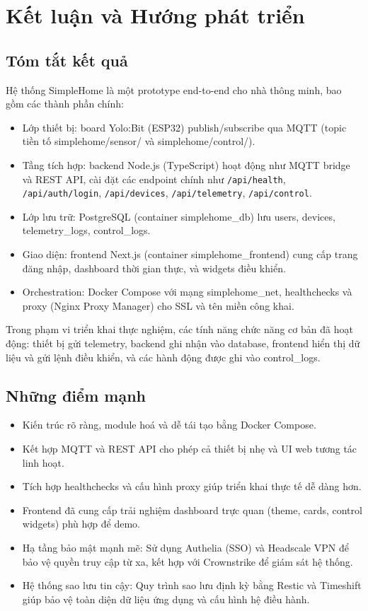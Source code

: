 \newpage
\section{Kết luận và Hướng phát triển}

\subsection*{Tóm tắt kết quả}

Hệ thống SimpleHome là một prototype end-to-end cho nhà thông minh, bao gồm các thành phần chính:
\begin{itemize}
    \item Lớp thiết bị: board Yolo:Bit (ESP32) publish/subscribe qua MQTT (topic tiền tố simplehome/sensor/ và simplehome/control/).
    \item Tầng tích hợp: backend Node.js (TypeScript) hoạt động như MQTT bridge và REST API, cài đặt các endpoint chính như \texttt{/api/health}, \texttt{/api/auth/login}, \texttt{/api/devices}, \texttt{/api/telemetry}, \texttt{/api/control}.
    \item Lớp lưu trữ: PostgreSQL (container simplehome\_db) lưu users, devices, telemetry\_logs, control\_logs.
    \item Giao diện: frontend Next.js (container simplehome\_frontend) cung cấp trang đăng nhập, dashboard thời gian thực, và widgets điều khiển.
    \item Orchestration: Docker Compose với mạng simplehome\_net, healthchecks và proxy (Nginx Proxy Manager) cho SSL và tên miền công khai.
\end{itemize}

Trong phạm vi triển khai thực nghiệm, các tính năng chức năng cơ bản đã hoạt động: thiết bị gửi telemetry, backend ghi nhận vào database, frontend hiển thị dữ liệu và gửi lệnh điều khiển, và các hành động được ghi vào control\_logs.

\subsection*{Những điểm mạnh}
\begin{itemize}
    \item Kiến trúc rõ ràng, module hoá và dễ tái tạo bằng Docker Compose.
    \item Kết hợp MQTT và REST API cho phép cả thiết bị nhẹ và UI web tương tác linh hoạt.
    \item Tích hợp healthchecks và cấu hình proxy giúp triển khai thực tế dễ dàng hơn.
    \item Frontend đã cung cấp trải nghiệm dashboard trực quan (theme, cards, control widgets) phù hợp để demo.
    \item Hạ tầng bảo mật mạnh mẽ: Sử dụng Authelia (SSO) và Headscale VPN để bảo vệ quyền truy cập từ xa, kết hợp với Crownstrike để giám sát hệ thống.
    \item Hệ thống sao lưu tin cậy: Quy trình sao lưu định kỳ bằng Restic và Timeshift giúp bảo vệ toàn diện dữ liệu ứng dụng và cấu hình hệ điều hành.
\end{itemize}

